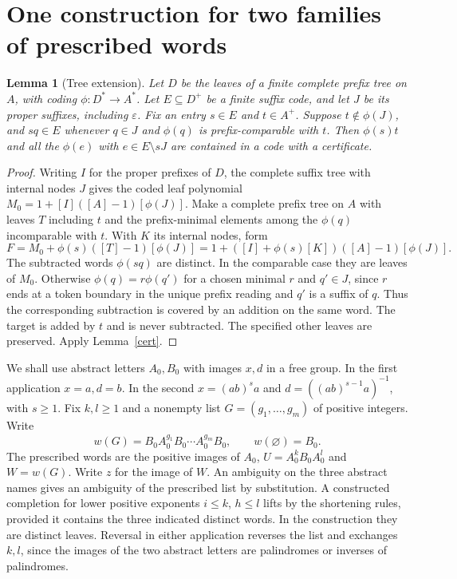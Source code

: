 \documentclass[11pt,a4paper]{article}
\newtheorem{lemma}{Lemma}
\newcommand{\eps}{\varepsilon}
\begin{document}
\section{One construction for two families of prescribed words}
\begin{lemma}[Tree extension]\label{graft}
Let $D$ be the leaves of a finite complete prefix tree on $A$, with coding $\phi:D^*\to A^*$. Let $E\subseteq D^+$ be a finite suffix code, and let $J$ be its proper suffixes, including $\eps$. Fix an entry $s\in E$ and $t\in A^+$. Suppose $t\notin\phi(J)$, and $sq\in E$ whenever $q\in J$ and $\phi(q)$ is prefix-comparable with $t$. Then $\phi(s)t$ and all the $\phi(e)$ with $e\in E\setminus sJ$ are contained in a code with a certificate.
\end{lemma}
\begin{proof}
Writing $I$ for the proper prefixes of $D$, the complete suffix tree with internal nodes $J$ gives the coded leaf polynomial $M_0=1+[I]([A]-1)[\phi(J)]$. Make a complete prefix tree on $A$ with leaves $T$ including $t$ and the prefix-minimal elements among the $\phi(q)$ incomparable with $t$. With $K$ its internal nodes, form
\[
 F=M_0+\phi(s)([T]-1)[\phi(J)]
   =1+([I]+\phi(s)[K])([A]-1)[\phi(J)] .
\]
The subtracted words $\phi(sq)$ are distinct. In the comparable case they are leaves of $M_0$. Otherwise $\phi(q)=r\phi(q')$ for a chosen minimal $r$ and $q'\in J$, since $r$ ends at a token boundary in the unique prefix reading and $q'$ is a suffix of $q$. Thus the corresponding subtraction is covered by an addition on the same word. The target is added by $t$ and is never subtracted. The specified other leaves are preserved. Apply Lemma~\ref{cert}.
\end{proof}
We shall use abstract letters $A_0,B_0$ with images $x,d$ in a free group. In the first application $x=a,d=b$. In the second $x=(ab)^s a$ and $d=((ab)^{s-1}a)^{-1}$, with $s\ge1$. Fix $k,l\ge1$ and a nonempty list $G=(g_1,\ldots,g_m)$ of positive integers. Write
\[
 w(G)=B_0 A_0^{g_1}B_0\cdots A_0^{g_m}B_0,\qquad w(\varnothing)=B_0 .
\]
The prescribed words are the positive images of $A_0$, $U=A_0^k B_0 A_0^l$ and $W=w(G)$. Write $z$ for the image of $W$. An ambiguity on the three abstract names gives an ambiguity of the prescribed list by substitution. A constructed completion for lower positive exponents $i\le k$, $h\le l$ lifts by the shortening rules, provided it contains the three indicated distinct words. In the construction they are distinct leaves. Reversal in either application reverses the list and exchanges $k,l$, since the images of the two abstract letters are palindromes or inverses of palindromes.
\end{document}
